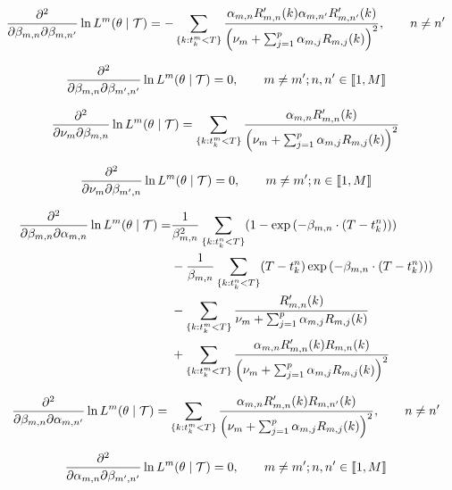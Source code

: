 \documentclass[11pt]{book}
\newcommand{\lsum}[1]{\sum_{ \{k : t_k^#1 < T \} }}
\newcommand{\lexp}[1]{
\exp \left ( - \beta_{m,n} \cdot ( T - t_k^#1 ) \right ) 
}
\newcommand{\denomR}{\nu_m + \sum_{j=1}^p \alpha_{m,j} R_{m,j} (k) }
\begin{document}
\begin{equation}
\frac{\partial^2 } {\partial \beta_{m,n} \partial \beta_{m,n'} } \ln L^m ( \theta \mid \Tau ) =  - \lsum{m} \frac{\alpha_{m,n} R'_{m,n}(k) \alpha_{m,n'} R'_{m,n'}(k) }{ \left ( \denomR \right )^2}, \qquad n\neq n'
\end{equation}

\begin{equation}
\frac{\partial^2 } {\partial \beta_{m,n} \partial \beta_{m',n'} } \ln L^m ( \theta \mid \mathcal{T} ) = 0, \qquad m \neq m'; n,n' \in  \llbracket 1, M \rrbracket
\end{equation}



\begin{equation}
\frac{\partial^2 } {\partial \nu_m \partial \beta_{m,n} } \ln L^m ( \theta \mid \Tau ) = \lsum{m} \frac{\alpha_{m,n} R'_{m,n}(k)}{\left ( \denomR \right )^2}
\end{equation}

\begin{equation}
\frac{\partial^2 } {\partial \nu_m \partial \beta_{m',n} } \ln L^m ( \theta \mid \mathcal{T} ) = 0, \qquad m \neq m'; n \in  \llbracket 1, M \rrbracket
\end{equation}


\begin{align}
\frac{\partial^2 } { \partial \beta_{m,n} \partial \alpha_{m,n} }  \ln L^m ( \theta \mid \Tau ) =  & \frac {1} {\beta_{m,n}^2} \lsum{n} ( 1 - \lexp{n} ) \notag \\ 
&-  \frac{ 1 } { \beta_{m,n} } \lsum{n} ( T-t_k^n) \lexp{n} ) \notag \\ 
&- \lsum{m} \frac{ R'_{m,n} (k) }{ \denomR  } \notag \\
&+ \lsum{m} \frac{ \alpha_{m,n} R'_{m,n} (k) R_{m,n}(k) }{ \left ( \denomR \right )^2 }
\end{align}

\begin{equation}
\frac{\partial^2 } { \partial \beta_{m,n} \partial \alpha_{m,n'} } \ln L^m ( \theta \mid \Tau ) = \lsum{m} \frac{ \alpha_{m,n} R'_{m,n} (k) R_{m,n'}(k) }{ \left ( \denomR \right )^2 }, \qquad n \neq n'
\end{equation}

\begin{equation}
\frac{\partial^2 } {\partial \alpha_{m,n} \partial \beta_{m',n'} } \ln L^m ( \theta \mid \mathcal{T} ) = 0, \qquad m \neq m'; n,n' \in  \llbracket 1, M \rrbracket
\end{equation}
\end{document}
